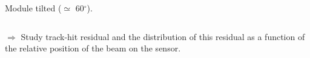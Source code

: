 \documentclass{beamer}
\newcommand{\grille}{
    \begin{tikzpicture}[overlay,remember picture]
        \begin{scope}[shift={(current page.south west)}]
            \draw[gray!50] (0,0) grid[step=2mm] (current page.north east);
            \draw[red!50] (0,0) grid[step=1cm] (current page.north east);
            \draw (0.2,1) node {1};
            \draw (0.2,2) node {2};
            \draw (0.2,3) node {3};
            \draw (0.2,4) node {4};
            \draw (0.2,5) node {5};
            \draw (0.2,6) node {6};
            \draw (0.2,7) node {7};
            \draw (0.2,8) node {8};
            \draw (0.2,9) node {9};
            \draw (1,0.5) node {1};
            \draw (2,0.5) node {2};
            \draw (3,0.5) node {3};
            \draw (4,0.5) node {4};
            \draw (5,0.5) node {5};
            \draw (6,0.5) node {6};
            \draw (7,0.5) node {7};
            \draw (8,0.5) node {8};
            \draw (9,0.5) node {9};
            \draw (10,0.5) node {10};
            \draw (11,0.5) node {11};
            \draw (12,0.5) node {12};
        \end{scope}
    \end{tikzpicture}
}
\newcommand{\degres}{\ensuremath{^\circ}}
\begin{document}
\begin{frame}
\begin{columns}[t]
\begin{column}{4cm}
\begin{center}
          \footnotesize{Module tilted ($\simeq$ 60\degres).}
        \end{center}
      \end{column}
    \end{columns}

    \vspace{0.1cm}
    \footnotesize{$\Rightarrow$ Study track-hit residual and the distribution of this residual as a function of the relative position of the beam on the sensor.

    \vspace{0.1cm}
    }
\end{frame}

\end{document}

